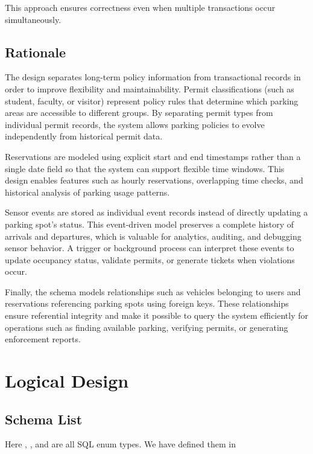 \documentclass[12pt]{report}
\begin{document}
This approach ensures correctness even when multiple transactions occur simultaneously.

\subsection{Rationale}

The design separates long-term policy information from transactional records in order to improve flexibility and maintainability. Permit classifications (such as student, faculty, or visitor) represent policy rules that determine which parking areas are accessible to different groups. By separating permit types from individual permit records, the system allows parking policies to evolve independently from historical permit data.

Reservations are modeled using explicit start and end timestamps rather than a single date field so that the system can support flexible time windows. This design enables features such as hourly reservations, overlapping time checks, and historical analysis of parking usage patterns.

Sensor events are stored as individual event records instead of directly updating a parking spot's status. This event-driven model preserves a complete history of arrivals and departures, which is valuable for analytics, auditing, and debugging sensor behavior. A trigger or background process can interpret these events to update occupancy status, validate permits, or generate tickets when violations occur.

Finally, the schema models relationships such as vehicles belonging to users and reservations referencing parking spots using foreign keys. These relationships ensure referential integrity and make it possible to query the system efficiently for operations such as finding available parking, verifying permits, or generating enforcement reports.


\section{Logical Design}

\subsection{Schema List}
Here , ,  and  are all SQL enum types. We have defined them in 
\end{document}
